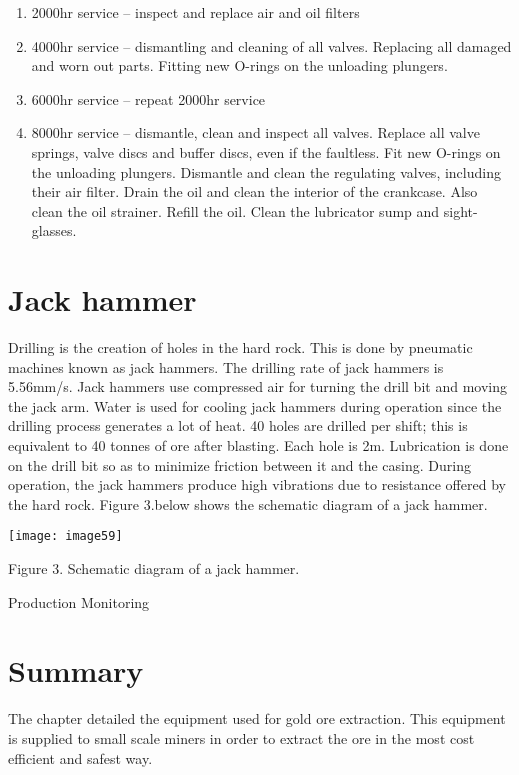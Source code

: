 \begin{enumerate}
\item  2000hr service -- inspect and replace air and oil filters

\item  4000hr service -- dismantling and cleaning of all valves. Replacing all damaged and worn out parts. Fitting new O-rings on the unloading plungers.

\item  6000hr service -- repeat 2000hr service

\item  8000hr service -- dismantle, clean and inspect all valves. Replace all valve springs, valve discs and buffer discs, even if the faultless. Fit new O-rings on the unloading plungers. Dismantle and clean the regulating valves, including their air filter. Drain the oil and clean the interior of the crankcase. Also clean the oil strainer. Refill the oil. Clean the lubricator sump and sight-glasses.\par
\end{enumerate}


\section{ Jack hammer}

\noindent Drilling is the creation of holes in the hard rock. This is done by pneumatic machines known as jack hammers. The drilling rate of jack hammers is 5.56mm/s. Jack hammers use compressed air for turning the drill bit and moving the jack arm. Water is used for cooling jack hammers during operation since the drilling process generates a lot of heat. 40 holes are drilled per shift; this is equivalent to 40 tonnes of ore after blasting. Each hole is 2m. Lubrication is done on the drill bit so as to minimize friction between it and the casing. During operation, the jack hammers produce high vibrations due to resistance offered by the hard rock. Figure 3.below shows the schematic diagram of a jack hammer.\par

\noindent 

\noindent \texttt{[image: image59]}

\noindent Figure 3. Schematic diagram of a jack hammer.

\noindent Production Monitoring


\section{ Summary}

\noindent The chapter detailed the equipment used for gold ore extraction. This equipment is supplied to small scale miners in order to extract the ore in the most cost efficient and safest way. \par